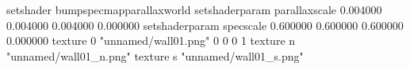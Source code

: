 setshader bumpspecmapparallaxworld
setshaderparam parallaxscale 0.004000 0.004000 0.004000 0.000000
setshaderparam specscale 0.600000 0.600000 0.600000 0.000000
texture 0 "unnamed/wall01.png" 0 0 0 1
texture n "unnamed/wall01_n.png"
texture s "unnamed/wall01_s.png"